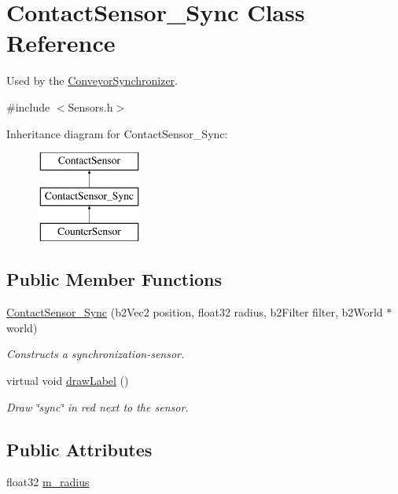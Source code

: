 \hypertarget{classContactSensor__Sync}{\section{Contact\-Sensor\-\_\-\-Sync Class Reference}
\label{classContactSensor__Sync}
}


Used by the \hyperlink{classConveyorSynchronizer}{Conveyor\-Synchronizer}.  




{\ttfamily \#include $<$Sensors.\-h$>$}

Inheritance diagram for Contact\-Sensor\-\_\-\-Sync\-:\begin{figure}[H]
\begin{center}
\leavevmode
\includegraphics[height=3.000000cm]{classContactSensor__Sync}
\end{center}
\end{figure}
\subsection*{Public Member Functions}
\begin{DoxyCompactItemize}
\item 
\hyperlink{classContactSensor__Sync_a3067639c78a7f5e01724f15bdf023026}{Contact\-Sensor\-\_\-\-Sync} (b2\-Vec2 position, float32 radius, b2\-Filter filter, b2\-World $\ast$world)
\begin{DoxyCompactList}\small\item\em Constructs a synchronization-\/sensor. \end{DoxyCompactList}\item 
virtual void \hyperlink{classContactSensor__Sync_ae7eed2d2ee0e58940426d4701f695481}{draw\-Label} ()
\begin{DoxyCompactList}\small\item\em Draw \char`\"{}sync\char`\"{} in red next to the sensor. \end{DoxyCompactList}\end{DoxyCompactItemize}
\subsection*{Public Attributes}
\begin{DoxyCompactItemize}
\item 
float32 \hyperlink{classContactSensor__Sync_ad744459b1b2dc3836a5f8a68a8f9ad38}{m\-\_\-radius}
\end{DoxyCompactItemize}



